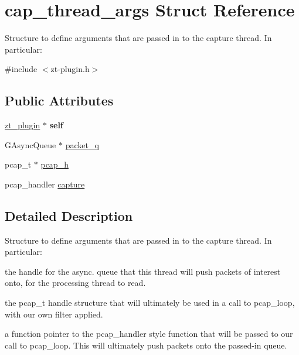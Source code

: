 \hypertarget{structcap__thread__args}{\section{cap\-\_\-thread\-\_\-args Struct Reference}
\label{structcap__thread__args}
}


Structure to define arguments that are passed in to the capture thread. In particular\-:  




{\ttfamily \#include $<$zt-\/plugin.\-h$>$}

\subsection*{Public Attributes}
\begin{DoxyCompactItemize}
\item 
\hypertarget{structcap__thread__args_a9ac47a604784dbf82c033273f446128f}{\hyperlink{struct__zt__plugin}{zt\-\_\-plugin} $\ast$ {\bfseries self}}\label{structcap__thread__args_a9ac47a604784dbf82c033273f446128f}

\item 
G\-Async\-Queue $\ast$ \hyperlink{structcap__thread__args_a48a9654ac9d6c95abfffdebd261df927}{packet\-\_\-q}
\item 
pcap\-\_\-t $\ast$ \hyperlink{structcap__thread__args_ac1729201a36634018f35f509ac884478}{pcap\-\_\-h}
\item 
pcap\-\_\-handler \hyperlink{structcap__thread__args_aa797d2a4089940a8d75083f4c22dadee}{capture}
\end{DoxyCompactItemize}


\subsection{Detailed Description}
Structure to define arguments that are passed in to the capture thread. In particular\-: 


\begin{DoxyItemize}
\item the handle for the async. queue that this thread will push packets of interest onto, for the processing thread to read.
\item the pcap\-\_\-t handle structure that will ultimately be used in a call to pcap\-\_\-loop, with our own filter applied.
\item a function pointer to the pcap\-\_\-handler style function that will be passed to our call to pcap\-\_\-loop. This will ultimately push packets onto the passed-\/in queue. 
\end{DoxyItemize}

